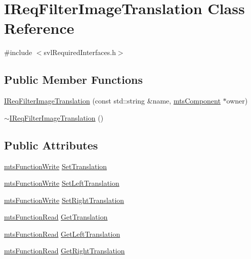\hypertarget{class_i_req_filter_image_translation}{\section{I\-Req\-Filter\-Image\-Translation Class Reference}
\label{class_i_req_filter_image_translation}
}


{\ttfamily \#include $<$svl\-Required\-Interfaces.\-h$>$}

\subsection*{Public Member Functions}
\begin{DoxyCompactItemize}
\item 
\hyperlink{class_i_req_filter_image_translation_a8e766cdc2bc9f544ac605a14a710af39}{I\-Req\-Filter\-Image\-Translation} (const std\-::string \&name, \hyperlink{classmts_component}{mts\-Component} $\ast$owner)
\item 
\hyperlink{class_i_req_filter_image_translation_a83b080cd42089b5661a8afb761348923}{$\sim$\-I\-Req\-Filter\-Image\-Translation} ()
\end{DoxyCompactItemize}
\subsection*{Public Attributes}
\begin{DoxyCompactItemize}
\item 
\hyperlink{classmts_function_write}{mts\-Function\-Write} \hyperlink{class_i_req_filter_image_translation_aa40f24911962a87d74a797d9e24ad16a}{Set\-Translation}
\item 
\hyperlink{classmts_function_write}{mts\-Function\-Write} \hyperlink{class_i_req_filter_image_translation_ab99c60eed341b085741f5aec0dfda366}{Set\-Left\-Translation}
\item 
\hyperlink{classmts_function_write}{mts\-Function\-Write} \hyperlink{class_i_req_filter_image_translation_a6fcebfa71603497d6dfc6079ffcd2a64}{Set\-Right\-Translation}
\item 
\hyperlink{classmts_function_read}{mts\-Function\-Read} \hyperlink{class_i_req_filter_image_translation_a4ed27bffc9481b959e2f4eff74461095}{Get\-Translation}
\item 
\hyperlink{classmts_function_read}{mts\-Function\-Read} \hyperlink{class_i_req_filter_image_translation_a9f6ae2c070505e7b5bb9949ac9344e50}{Get\-Left\-Translation}
\item 
\hyperlink{classmts_function_read}{mts\-Function\-Read} \hyperlink{class_i_req_filter_image_translation_a0e4cedffbd716f412e37ada2ba0501bd}{Get\-Right\-Translation}
\end{DoxyCompactItemize}


